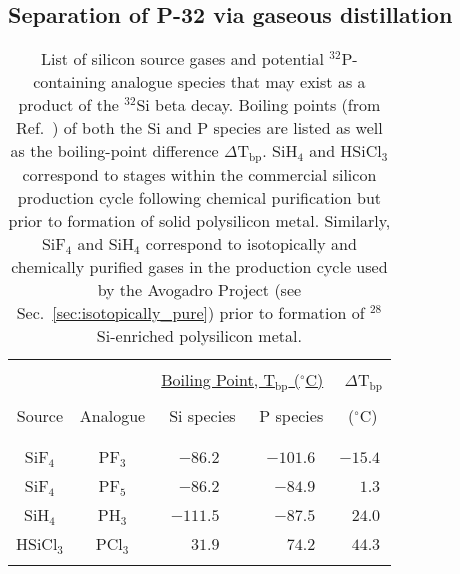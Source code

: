 \documentclass[final,5p]{elsarticle}
\def\si{$^{32}$Si\xspace}
\def\p{$^{32}$P\xspace}
\def\esi{$^{28}$Si\xspace}
\begin{document}
\subsection{Separation of P-32 via gaseous distillation}\label{ssec:distillation}
\begin{table}[!b]
\small
\begin{center}
\begin{tabular}{ c c r r r}
\hline 
& & & & \\[-1em]
 &  & \multicolumn{2}{c}{\underline{Boiling Point, T$_{\textrm{bp}}$ ($^{\circ}$C)}} & $\Delta$T$_{\textrm{bp}}$\\
& & & & \\[-1em]
Source & Analogue & Si species & P species &  ($^{\circ}$C)\,\,\\
& & & & \\[-1em]
\hline
& & & & \\[-1em]
SiF$_4$ & PF$_{3}$ & $-86.2$~~ & $-101.6$~ & $-15.4$\,\\
SiF$_4$ & PF$_{5}$ & $-86.2$~~ & $-84.9$~ & $1.3$\,\\
SiH$_4$ & PH$_{3}$ & $-111.5$~~ & $-87.5$~ & $24.0$\,\\
HSiCl$_3$ & PCl$_{3}$ & $31.9$~~ & $74.2$~ & $44.3$\,\\
& & & & \\[-1em]
\hline
\end{tabular}
\end{center}
\caption{\small List of silicon source gases and potential \p-containing analogue species that may exist as a product of the \si beta decay. Boiling points (from Ref.\ \cite{boiling_point}) of both the Si and P species are listed as well as the boiling-point difference $\Delta$T$_{\textrm{bp}}$. SiH$_4$ and HSiCl$_3$ correspond to stages within the commercial silicon production cycle following chemical purification but prior to formation of solid polysilicon metal.  Similarly, SiF$_4$ and SiH$_4$ correspond to isotopically and chemically purified gases in the production cycle used by the Avogadro Project (see Sec.~\ref{sec:isotopically_pure}) prior to formation of \esi-enriched polysilicon metal.}
\label{tab:boiling_points}
\end{table}
\end{document}
